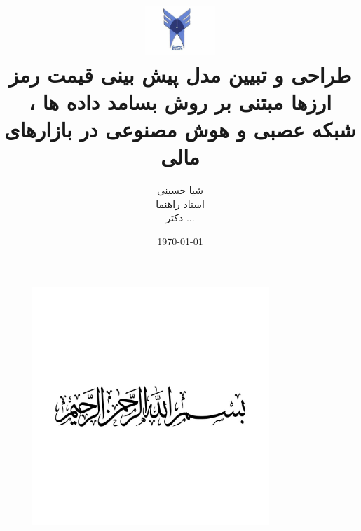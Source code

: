 \documentclass[14pt]{report}
\begin{document}
	
	
	
	\thispagestyle{empty}
	\begin{center}
		
		\begin{figure}
			\centering
			\includegraphics[width=0.8\textwidth]{fig-1.jpg}
		\end{figure}
	\end{center}
	\newpage\thispagestyle{empty}
	
	\title{	\centering\includegraphics[width=0.2\textwidth]{fig0}\\طراحی و تبیین مدل پیش بینی قیمت رمز ارزها مبتنی بر روش بسامد داده ها ، شبکه عصبی و هوش مصنوعی در بازارهای مالی }
	\author{شیا حسینی\\استاد راهنما \\دکتر ...}
	\date{\today}
	
	\maketitle
	
	
	
	
	\tableofcontents\thispagestyle{empty}
	\newpage
	\listoffigures\thispagestyle{empty}
	\newpage
	\listoftables\thispagestyle{empty}
	
	
	
	
	
	
	
	
	
	
	
	
	\newpage
	
	
	
	
	
	 
	 
	
	
	\newpage
	
	
	
	
\end{document}
